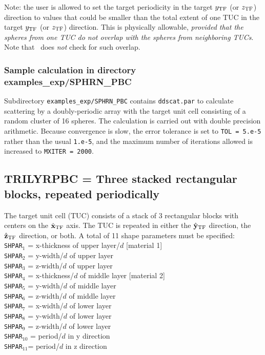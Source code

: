 	Note: the user is allowed to set the target periodicity in the
	target $y_{\rm TF}$ (or $z_{\rm TF}$) direction to values that could be smaller 
        than the total extent of one TUC in the target $y_{\rm TF}$ 
	(or $z_{\rm TF}$) direction.
	This is physically allowable, {\it provided that the spheres from
	one TUC do not overlap with the spheres from neighboring TUCs}.
	Note that \ddscat\ does {\it not} check for such overlap.
\subsubsection{\bf Sample calculation in directory examples\_exp/SPHRN\_PBC}
Subdirectory {\tt examples\_exp/SPHRN\_PBC} contains {\tt ddscat.par}
to calculate scattering by a doubly-periodic array with the target unit
cell consisting of a random cluster of 16 spheres.
The calculation is carried out with double precision arithmetic.
Because convergence is slow, the error tolerance is set to {\tt TOL = 5.e-5}
rather than the usual {\tt 1.e-5}, and the maximum number of iterations
allowed is increased to {\tt MXITER = 2000}.
\subsection{ TRILYRPBC = Three stacked rectangular blocks, 
            repeated periodically}
        \label{sec:TRILYRPBC}
	The target unit cell (TUC) consists of a stack of 3 rectangular blocks
	with centers on the $\hat{\bf x}_{\rm TF}$ axis.
	The TUC is repeated in either the $\hat{\bf y}_{\rm TF}$ direction, the $\hat{\bf z}_{\rm TF}$
	direction, or both.
	A total of 11 shape parameters must be specified:\\
        {\tt SHPAR$_1$} = x-thickness of upper layer/$d$ [material 1]\\
        {\tt SHPAR$_2$} = y-width/$d$ of upper layer\\
        {\tt SHPAR}$_3$ = z-width/$d$ of upper layer\\
        {\tt SHPAR}$_4$ = x-thickness/$d$ of middle layer [material 2]\\
        {\tt SHPAR}$_5$ = y-width/$d$ of middle layer\\
        {\tt SHPAR}$_6$ = z-width/$d$ of middle layer\\
        {\tt SHPAR}$_7$ = x-width/$d$ of lower layer\\
        {\tt SHPAR}$_8$ = y-width/$d$ of lower layer\\
        {\tt SHPAR}$_9$ = z-width/$d$ of lower layer\\
        {\tt SHPAR}$_{10}$ = period/$d$ in y direction\\
        {\tt SHPAR}$_{11}$= period/$d$ in z direction

